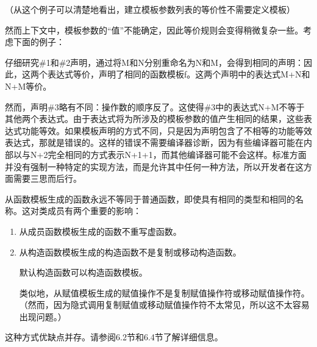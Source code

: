 （从这个例子可以清楚地看出，建立模板参数列表的等价性不需要定义模板）

然而上下文中，模板参数的“值”不能确定，因此等价规则会变得稍微复杂一些。考虑下面的例子：


仔细研究\#1和\#2声明，通过将M和N分别重命名为N和M，会得到相同的声明：因此，这两个表达式等价，声明了相同的函数模板f。这两个声明中的表达式M+N和N+M等价。

然而，声明\#3略有不同：操作数的顺序反了。这使得\#3中的表达式N+M不等于其他两个表达式。由于表达式将为所涉及的模板参数的值产生相同的结果，这些表达式功能等效。如果模板声明的方式不同，只是因为声明包含了不相等的功能等效表达式，那就是错误的。这样的错误不需要编译器诊断，因为有些编译器可能在内部以与N+2完全相同的方式表示N+1+1，而其他编译器可能不会这样。标准方面并没有强制一种特定的实现方法，而是允许其中任何一种方法，所以开发者在这方面需要三思而后行。

从函数模板生成的函数永远不等同于普通函数，即使具有相同的类型和相同的名称。这对类成员有两个重要的影响：

\begin{enumerate}
\item
从成员函数模板生成的函数不重写虚函数。

\item
从构造函数模板生成的构造函数不是复制或移动构造函数。

\begin{notice}
默认构造函数可以构造函数模板。
\end{notice}

类似地，从赋值模板生成的赋值操作不是复制赋值操作符或移动赋值操作符。（然而，因为隐式调用复制赋值或移动赋值操作符不太常见，所以这不太容易出现问题。）
\end{enumerate}

这种方式优缺点并存。请参阅6.2节和6.4节了解详细信息。











